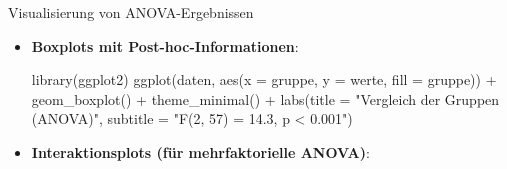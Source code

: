 \documentclass[
  ignorenonframetext,
]{beamer}
\newenvironment{Shaded}{\begin{snugshade}}{\end{snugshade}}
\newcommand{\AttributeTok}[1]{\textcolor[rgb]{0.40,0.45,0.13}{#1}}
\newcommand{\CommentTok}[1]{\textcolor[rgb]{0.37,0.37,0.37}{#1}}
\newcommand{\FunctionTok}[1]{\textcolor[rgb]{0.28,0.35,0.67}{#1}}
\newcommand{\NormalTok}[1]{\textcolor[rgb]{0.00,0.23,0.31}{#1}}
\newcommand{\SpecialCharTok}[1]{\textcolor[rgb]{0.37,0.37,0.37}{#1}}
\newcommand{\StringTok}[1]{\textcolor[rgb]{0.13,0.47,0.30}{#1}}
\begin{document}
\begin{frame}[fragile]{Visualisierung von ANOVA-Ergebnissen}
\protect{}\label{visualisierung-von-anova-ergebnissen}
\begin{itemize}
\item
  \textbf{Boxplots mit Post-hoc-Informationen}:

\begin{Shaded}
\begin{Highlighting}[]
\FunctionTok{library}\NormalTok{(ggplot2)}
\FunctionTok{ggplot}\NormalTok{(daten, }\FunctionTok{aes}\NormalTok{(}\AttributeTok{x =}\NormalTok{ gruppe, }\AttributeTok{y =}\NormalTok{ werte, }\AttributeTok{fill =}\NormalTok{ gruppe)) }\SpecialCharTok{+}
  \FunctionTok{geom\_boxplot}\NormalTok{() }\SpecialCharTok{+}
  \FunctionTok{theme\_minimal}\NormalTok{() }\SpecialCharTok{+}
  \FunctionTok{labs}\NormalTok{(}\AttributeTok{title =} \StringTok{"Vergleich der Gruppen (ANOVA)"}\NormalTok{,}
       \AttributeTok{subtitle =} \StringTok{"F(2, 57) = 14.3, p \textless{} 0.001"}\NormalTok{)}
\end{Highlighting}
\end{Shaded}
\item
  \textbf{Interaktionsplots (für mehrfaktorielle ANOVA)}:

\begin{Shaded}
\end{Shaded}
\end{itemize}
\end{frame}
\end{document}
